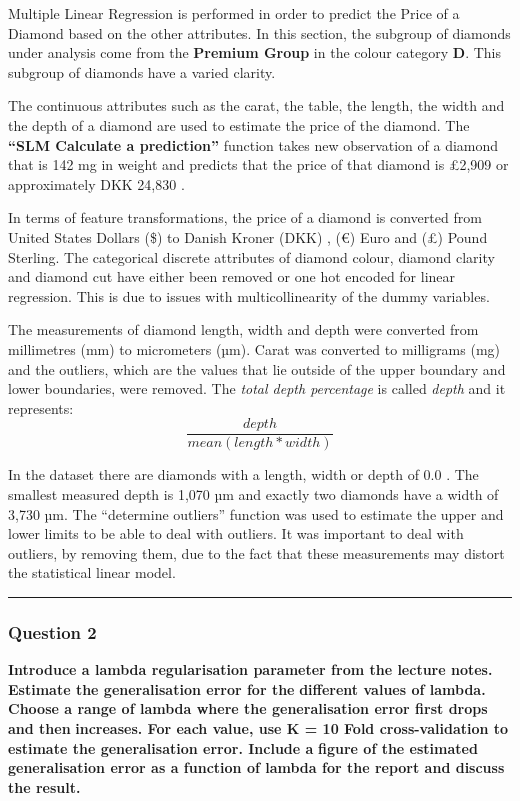 \documentclass[
]{article}
\begin{document}
Multiple Linear Regression is performed in order to predict the Price of
a Diamond based on the other attributes. In this section, the subgroup
of diamonds under analysis come from the \textbf{Premium Group} in the
colour category \textbf{D}. This subgroup of diamonds have a varied
clarity.

The continuous attributes such as the carat, the table, the length, the
width and the depth of a diamond are used to estimate the price of the
diamond. The \textbf{``SLM Calculate a prediction''} function takes new
observation of a diamond that is 142 mg in weight and predicts that the
price of that diamond is £2,909 or approximately DKK 24,830 .

In terms of feature transformations, the price of a diamond is converted
from United States Dollars (\$) to Danish Kroner (DKK) , (€) Euro and
(£) Pound Sterling. The categorical discrete attributes of diamond
colour, diamond clarity and diamond cut have either been removed or one
hot encoded for linear regression. This is due to issues with
multicollinearity of the dummy variables.

The measurements of diamond length, width and depth were converted from
millimetres (mm) to micrometers (µm). Carat was converted to milligrams
(mg) and the outliers, which are the values that lie outside of the
upper boundary and lower boundaries, were removed. The \emph{total depth
percentage} is called \emph{depth} and it represents:
\[\frac{depth} {mean( length * width)}\]

In the dataset there are diamonds with a length, width or depth of 0.0 .
The smallest measured depth is 1,070 µm and exactly two diamonds have a
width of 3,730 µm. The ``determine outliers'' function was used to
estimate the upper and lower limits to be able to deal with outliers. It
was important to deal with outliers, by removing them, due to the fact
that these measurements may distort the statistical linear model.

\begin{center}\rule{0.5\linewidth}{0.5pt}\end{center}

\hypertarget{question-2}{%
\subsubsection{Question 2}\label{question-2}}

\textbf{Introduce a lambda regularisation parameter from the lecture
notes. Estimate the generalisation error for the} \textbf{different
values of lambda. Choose a range of lambda where the generalisation
error first drops and then} \textbf{increases. For each value, use K =
10 Fold cross-validation to estimate the generalisation error. Include
a} \textbf{figure of the estimated generalisation error as a function of
lambda for the report and discuss the result.}
\end{document}
